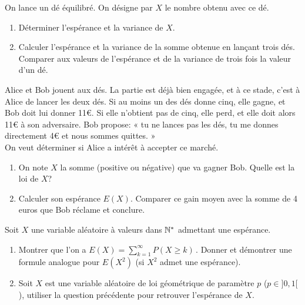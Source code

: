\documentclass[a4paper,12pt,reqno]{amsart}
\begin{document}


\begin{exo}

  On lance un dé équilibré. On désigne par $X$ le nombre obtenu avec ce dé.

  \begin{enumerate}
    \item Déterminer l'espérance et la variance de $X$.
    \item Calculer l'espérance et la variance de la somme obtenue en lançant trois dés. Comparer aux valeurs de l'espérance et de la variance de trois fois la valeur d'un dé.
  \end{enumerate}

\end{exo}

\begin{exo}

  Alice et Bob jouent aux dés. La partie est déjà bien engagée, et à ce stade, c'est à Alice de lancer les deux dés. Si au moins un des dés donne cinq, elle gagne, et Bob doit lui donner 11€. Si elle n'obtient pas de cinq, elle perd, et elle doit alors 11€ à son adversaire. Bob propose:
  « tu ne lances pas les dés, tu me donnes directement 4€ et nous sommes quittes. » \\
  On veut déterminer si Alice a intérêt à accepter ce marché.

  \begin{enumerate}
    \item On note $ X $ la somme (positive ou négative) que va gagner Bob. Quelle est la loi de $ X $?
    \item Calculer son espérance $ E(X) $. Comparer ce gain moyen avec la somme de 4 euros que Bob réclame et conclure.
  \end{enumerate}

\end{exo}

\begin{exo}

  Soit $X$ une variable aléatoire à valeurs dans $\mathbb{N}^*$ admettant une espérance.

  \begin{enumerate}
    \item Montrer que l'on a $\displaystyle E(X)=\sum_{k=1}^\infty P(X \geq k) \, .$ Donner et démontrer une formule analogue pour $E(X^2)$ (si $X^2$ admet une espérance).
    \item Soit $X$ est une variable aléatoire de loi géométrique de paramètre $p$ ($p  \in ]0,1[$), utiliser la question précédente pour retrouver l'espérance de $X$.
  \end{enumerate}

\end{exo}
\end{document}
